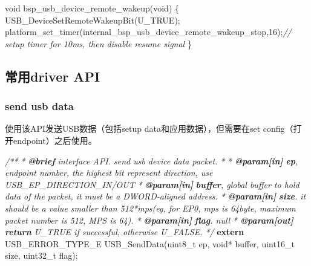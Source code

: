 \documentclass[
  12pt,
]{book}
\newenvironment{Shaded}{\begin{snugshade}}{\end{snugshade}}
\newcommand{\AnnotationTok}[1]{\textcolor[rgb]{0.56,0.35,0.01}{\textbf{\textit{#1}}}}
\newcommand{\CommentTok}[1]{\textcolor[rgb]{0.56,0.35,0.01}{\textit{#1}}}
\newcommand{\CommentVarTok}[1]{\textcolor[rgb]{0.56,0.35,0.01}{\textbf{\textit{#1}}}}
\newcommand{\DataTypeTok}[1]{\textcolor[rgb]{0.13,0.29,0.53}{#1}}
\newcommand{\DecValTok}[1]{\textcolor[rgb]{0.00,0.00,0.81}{#1}}
\newcommand{\KeywordTok}[1]{\textcolor[rgb]{0.13,0.29,0.53}{\textbf{#1}}}
\newcommand{\NormalTok}[1]{#1}
\begin{document}
\begin{Shaded}
\begin{Highlighting}[]
\DataTypeTok{void}\NormalTok{ bsp_usb_device_remote_wakeup(}\DataTypeTok{void}\NormalTok{)}
\NormalTok{\{}
\NormalTok{  USB_DeviceSetRemoteWakeupBit(U_TRUE);}
\NormalTok{  platform_set_timer(internal_bsp_usb_device_remote_wakeup_stop,}\DecValTok{16}\NormalTok{);}\CommentTok{// setup timer for 10ms, then disable resume signal}
\NormalTok{\}}
\end{Highlighting}
\end{Shaded}

\hypertarget{ux5e38ux7528driver-api}{%
\subsection{常用driver API}\label{ux5e38ux7528driver-api}}

\hypertarget{send-usb-data}{%
\subsubsection{send usb data}\label{send-usb-data}}

使用该API发送USB数据（包括setup data和应用数据），但需要在set config（打开endpoint）之后使用。

\begin{Shaded}
\begin{Highlighting}[]
\CommentTok{/**}
\CommentTok{ * }\AnnotationTok{@brief}\CommentTok{ interface API. send usb device data packet.}
\CommentTok{ *}
\CommentTok{ * }\AnnotationTok{@param[in]}\CommentTok{ }\CommentVarTok{ep}\CommentTok{, endpoint number, the highest bit represent direction, use USB_EP_DIRECTION_IN/OUT}
\CommentTok{ * }\AnnotationTok{@param[in]}\CommentTok{ }\CommentVarTok{buffer}\CommentTok{, global buffer to hold data of the packet, it must be a DWORD-aligned address. }
\CommentTok{ * }\AnnotationTok{@param[in]}\CommentTok{ }\CommentVarTok{size}\CommentTok{. it should be a value smaller than 512*mps(eg, for EP0, mps is 64byte, maximum packet number is 512, MPS is 64).}
\CommentTok{ * }\AnnotationTok{@param[in]}\CommentTok{ }\CommentVarTok{flag}\CommentTok{. null}
\CommentTok{ * }\AnnotationTok{@param[out]}\CommentTok{ }\CommentVarTok{return}\CommentTok{ U_TRUE if successful, otherwise U_FALSE. }
\CommentTok{ */}
\KeywordTok{extern}\NormalTok{ USB_ERROR_TYPE_E USB_SendData(}\DataTypeTok{uint8_t}\NormalTok{ ep, }\DataTypeTok{void}\NormalTok{* buffer, }\DataTypeTok{uint16_t}\NormalTok{ size, }\DataTypeTok{uint32_t}\NormalTok{ flag);}
\end{Highlighting}
\end{Shaded}
\end{document}
